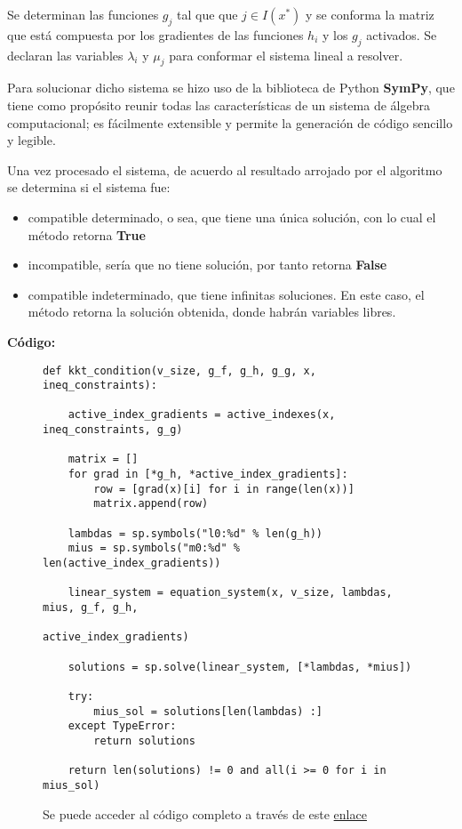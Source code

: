\documentclass[titlepage, 11pt]{scrartcl}
\begin{document}
	Se determinan las funciones $g_j$ tal que que $j\in I(x^*)$ y se conforma la matriz que está compuesta por los gradientes de las funciones $h_i$ y los $g_j$ activados. Se declaran las variables $\lambda_i$ y $\mu_j$ para conformar el sistema lineal a resolver.
	
	Para solucionar dicho sistema se hizo uso de la biblioteca de Python \textbf{SymPy}, que tiene como propósito reunir todas las características de un sistema de álgebra computacional; es fácilmente extensible y permite la generación de código sencillo y legible.
	
	Una vez procesado el sistema, de acuerdo al resultado arrojado por el algoritmo se determina si el sistema fue:
	\begin{itemize}
		\item  compatible determinado, o sea, que tiene una única solución, con lo cual el método retorna \textbf{True}
		\item incompatible, sería que no tiene solución, por tanto retorna \textbf{False}
		\item compatible indeterminado, que tiene infinitas soluciones. En este caso, el método retorna la solución obtenida, donde habrán variables libres.
		
	\end{itemize}
	\vspace{7mm}
	\textbf{C\'odigo:}
	\begin{figure}[H]
		\begin{verbatim}
def kkt_condition(v_size, g_f, g_h, g_g, x, ineq_constraints):

	active_index_gradients = active_indexes(x, ineq_constraints, g_g)
	
	matrix = []
	for grad in [*g_h, *active_index_gradients]:
		row = [grad(x)[i] for i in range(len(x))]
		matrix.append(row)
		
	lambdas = sp.symbols("l0:%d" % len(g_h))
	mius = sp.symbols("m0:%d" % len(active_index_gradients))
		
	linear_system = equation_system(x, v_size, lambdas, mius, g_f, g_h,
									 active_index_gradients)
	
	solutions = sp.solve(linear_system, [*lambdas, *mius])

	try:
		mius_sol = solutions[len(lambdas) :]
	except TypeError:
		return solutions
	
	return len(solutions) != 0 and all(i >= 0 for i in mius_sol) 
		\end{verbatim}
		\caption{Se puede acceder al código completo a través de este \href{utils.py}{enlace}}
		\label{fig:code}
	\end{figure}
\end{document}
